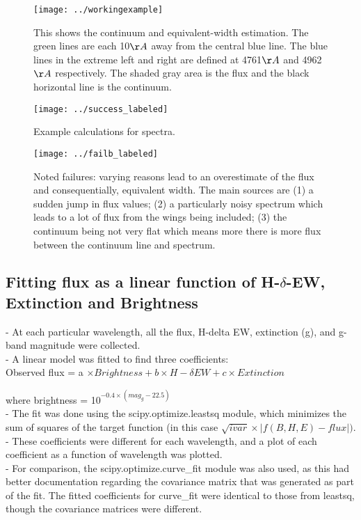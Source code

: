 \documentclass[manuscript]{aastex}
\begin{document}
\begin{figure}
\texttt{[image: ../workingexample]}\\
\caption{This shows the continuum and equivalent-width estimation. The green lines are each 10$\AA$  away from the central blue line. The blue lines in the extreme left and right are defined at 4761$\AA$ and 4962$\AA$  respectively. The shaded gray area is the flux and the black horizontal line is the continuum.}
\end{figure}
\begin{figure}
\texttt{[image: ../success\_labeled]}\\
\caption{Example calculations for spectra.}
\end{figure}
\begin{figure}
\texttt{[image: ../failb\_labeled]}\\
\caption{Noted failures: varying reasons lead to an overestimate of the flux and consequentially, equivalent width. The main sources are (1) a sudden jump in flux values; (2) a particularly noisy spectrum which leads to a lot of flux from the wings being included; (3) the continuum being not very flat which means more there is more flux between the continuum line and spectrum.}
\end{figure}

\subsection{Fitting flux as a linear function of H-$\delta$-EW, Extinction and Brightness}
- At each particular wavelength, all the flux, H-delta EW, extinction (g), and g-band magnitude were collected. \\
- A linear model was fitted to find three coefficients:\\
Observed flux = a $\times Brightness + b \times H-\delta  EW + c \times Extinction$

 where brightness = 10$^{-0.4 \times (mag_g - 22.5)}$\\
- The fit was done using the scipy.optimize.leastsq module, which minimizes the sum of squares of the target function (in this case $\sqrt{ivar} \times |f(B,H,E)-flux|).$\\
- These coefficients were different for each wavelength, and a plot of each coefficient as a function of wavelength was plotted.\\
- For comparison, the scipy.optimize.curve\_fit module was also used, as this had better documentation regarding the covariance matrix that was generated as part of the fit. The fitted coefficients for curve\_fit were identical to those from leastsq, though the covariance matrices were different.\\
\end{document}
